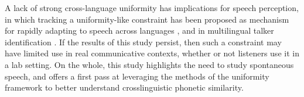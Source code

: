 A lack of strong cross-language uniformity has implications for speech perception, in which tracking a uniformity-like constraint has been proposed as mechanism for rapidly adapting to speech across languages \citep{reinisch_2013_retune}, and in multilingual talker identification \citep{orena_2019_identifying}. If the results of this study persist, then such a constraint may have limited use in real communicative contexts, whether or not listeners use it in a lab setting. On the whole, this study highlights the need to study spontaneous speech, and offers a first pass at leveraging the methods of the uniformity framework to better understand crosslinguistic phonetic similarity.

\endinput %